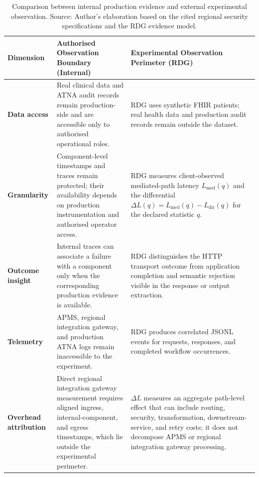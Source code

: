 \begingroup
    \renewcommand{\arraystretch}{1.0}
\begin{table}[H]
    \centering
    \caption[Comparison between internal production evidence and external experimental observation]{Comparison between internal production evidence and external
    experimental observation. Source: Author's elaboration based on the cited
    regional security specifications and the RDG evidence model.}
    \label{tab:internal-external-observation}
    \footnotesize
    \setlength{\tabcolsep}{3.5pt}
\begin{tabular}{|>{\raggedright\arraybackslash}p{2.5cm}|>{\raggedright\arraybackslash}p{4.75cm}|>{\raggedright\arraybackslash}p{5.15cm}|}
        \hline
        \rowcolor{veryPeri!18}
        \textbf{Dimension} & \textbf{Authorised Observation Boundary (Internal)} & \textbf{Experimental Observation Perimeter (RDG)} \\
        \hline
        \rowcolor{tableGray}
        \textbf{Data access}
        & Real clinical data and ATNA audit records remain production-side and are accessible only to authorised operational roles.
        & RDG uses synthetic FHIR patients; real health data and production audit records remain outside the dataset. \\
        \hline
        \textbf{Granularity}
        & Component-level timestamps and traces remain protected; their availability depends on production instrumentation and authorised operator access.
        & RDG measures client-observed mediated-path latency $L_{\mathrm{med}}(q)$ and the differential $\Delta L(q)=L_{\mathrm{med}}(q)-L_{\mathrm{dir}}(q)$ for the declared statistic $q$. \\
        \hline
        \rowcolor{tableGray}
        \textbf{Outcome insight}
        & Internal traces can associate a failure with a component only when the corresponding production evidence is available.
        & RDG distinguishes the HTTP transport outcome from application completion and semantic rejection visible in the response or output extraction. \\
        \hline
        \textbf{Telemetry}
        & APMS, regional integration gateway, and production ATNA logs remain inaccessible to the experiment.
        & RDG produces correlated JSONL events for requests, responses, and completed workflow occurrences. \\
        \hline
        \rowcolor{tableGray}
        \textbf{Overhead attribution}
        & Direct regional integration gateway measurement requires aligned ingress, internal-component, and egress timestamps, which lie outside the experimental perimeter.
        & $\Delta L$ measures an aggregate path-level effect that can include routing, security, transformation, downstream-service, and retry costs; it does not decompose APMS or regional integration gateway processing. \\
        \hline
\end{tabular}
\end{table}
\endgroup
\clearpage

